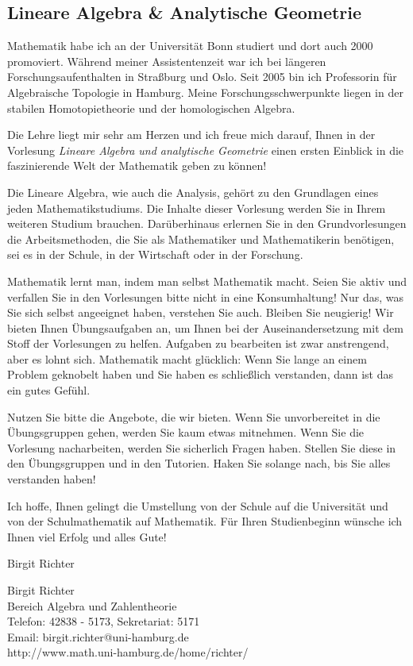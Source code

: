
\subsection{Lineare Algebra \& Analytische Geometrie}

\bigskip \noindent Mathematik habe ich an der Universit\"at Bonn studiert und
dort auch 2000 promoviert. W\"ahrend meiner Assistentenzeit war ich bei
l\"angeren Forschungsaufent\-halten in Stra{\ss}burg und Oslo. Seit 2005 bin
ich Professorin f\"ur Algebraische Topologie in Hamburg. Meine
Forschungsschwerpunkte liegen in der stabilen Homoto\-pie\-theorie und der
homologischen Algebra.

\medskip

Die Lehre liegt mir sehr am Herzen und ich freue mich darauf, Ihnen in der
Vorlesung \emph{Lineare Algebra und analytische Geometrie} einen ersten
Einblick in die faszinierende Welt der Mathematik geben zu k\"onnen!


\medskip

Die Lineare Algebra, wie auch die Analysis, geh\"ort zu den Grundlagen eines
jeden Mathematikstudiums. Die Inhalte dieser Vorlesung werden Sie in Ihrem
weiteren Studium brauchen. Dar\"uberhinaus erlernen Sie in den Grundvorlesungen
die Arbeitsmethoden, die Sie als Mathematiker und Mathematikerin ben\"otigen,
sei es in der Schule, in der Wirtschaft oder in der Forschung. 

\medskip

Mathematik lernt man, indem man selbst Mathematik macht. Seien Sie aktiv und
verfallen Sie in den Vorlesungen bitte nicht in eine Konsumhaltung!  Nur das,
was Sie sich selbst angeeignet haben, verstehen Sie auch. Bleiben Sie
neugierig! Wir bieten Ihnen \"Ubungsaufgaben an, um Ihnen bei der
Auseinandersetzung mit dem Stoff der Vorlesungen zu helfen. Aufgaben zu
bearbeiten ist zwar anstrengend, aber es lohnt sich.  Mathematik macht
gl\"ucklich: Wenn Sie lange an einem Problem geknobelt haben und Sie haben es
schlie{\ss}lich verstanden, dann ist das ein gutes Gef\"uhl. 

Nutzen Sie bitte die Angebote, die wir bieten. Wenn Sie unvorbereitet in die
\"Ubungsgruppen gehen, werden Sie kaum etwas mitnehmen. Wenn Sie die Vorlesung
nacharbeiten, werden Sie sicherlich Fragen haben. Stellen Sie diese in den
\"Ubungsgruppen und in den Tutorien. Haken Sie solange nach, bis Sie alles
verstanden haben! 

\medskip

Ich hoffe, Ihnen gelingt die Umstellung von der Schule auf die Universit\"at
und von der Schulmathematik auf Mathematik.   F\"ur Ihren Studienbeginn
w\"unsche ich Ihnen viel Erfolg und alles Gute!

\bigskip

\hfill Birgit Richter

\bigskip \noindent
Birgit Richter \\
Bereich Algebra und Zahlentheorie\\
Telefon: 42838 - 5173, Sekretariat: 5171\\
Email: birgit.richter@uni-hamburg.de\\
http://www.math.uni-hamburg.de/home/richter/
